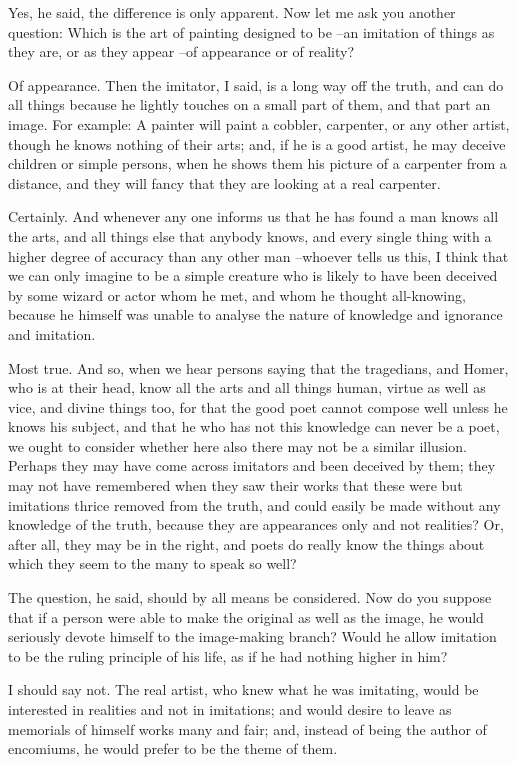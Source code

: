 Yes, he said, the difference is only apparent.
Now let me ask you another question: Which is the art of painting designed to be --an imitation of things as they are, or as they appear --of appearance or of reality?

Of appearance.
Then the imitator, I said, is a long way off the truth, and can do all things because he lightly touches on a small part of them, and that part an image. For example: A painter will paint a cobbler, carpenter, or any other artist, though he knows nothing of their arts; and, if he is a good artist, he may deceive children or simple persons, when he shows them his picture of a carpenter from a distance, and they will fancy that they are looking at a real carpenter.

Certainly.
And whenever any one informs us that he has found a man knows all the arts, and all things else that anybody knows, and every single thing with a higher degree of accuracy than any other man --whoever tells us this, I think that we can only imagine to be a simple creature who is likely to have been deceived by some wizard or actor whom he met, and whom he thought all-knowing, because he himself was unable to analyse the nature of knowledge and ignorance and imitation.

Most true.
And so, when we hear persons saying that the tragedians, and Homer, who is at their head, know all the arts and all things human, virtue as well as vice, and divine things too, for that the good poet cannot compose well unless he knows his subject, and that he who has not this knowledge can never be a poet, we ought to consider whether here also there may not be a similar illusion. Perhaps they may have come across imitators and been deceived by them; they may not have remembered when they saw their works that these were but imitations thrice removed from the truth, and could easily be made without any knowledge of the truth, because they are appearances only and not realities? Or, after all, they may be in the right, and poets do really know the things about which they seem to the many to speak so well?

The question, he said, should by all means be considered.
Now do you suppose that if a person were able to make the original as well as the image, he would seriously devote himself to the image-making branch? Would he allow imitation to be the ruling principle of his life, as if he had nothing higher in him?

I should say not.
The real artist, who knew what he was imitating, would be interested in realities and not in imitations; and would desire to leave as memorials of himself works many and fair; and, instead of being the author of encomiums, he would prefer to be the theme of them.

